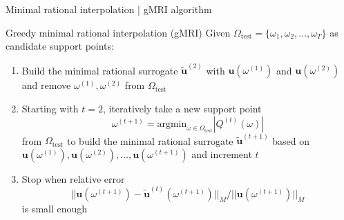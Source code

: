 \documentclass{beamer}
\begin{document}
\begin{frame}{Minimal rational interpolation | gMRI algorithm}
    
    \begin{block}{Greedy minimal rational interpolation (gMRI) \cite{shortMRI}}
        Given $\Omega_{\text{test}} = \{\omega_1, \omega_2, \dots, \omega_T\}$ as candidate support points:
        \begin{enumerate}
            \item<2-> Build the minimal rational surrogate $\mathbf{\tilde{u}}^{(2)}$
                      with $\mathbf{u}(\omega^{(1)})$ and $\mathbf{u}(\omega^{(2)})$
                      and remove $\omega^{(1)}, \omega^{(2)}$ from $\Omega_{\text{test}}$
            \item<3-> Starting with $t=2$, iteratively take a new support point
            \begin{equation*}
                \omega^{(t+1)} = \text{argmin}_{\omega \in \Omega_{\text{test}}} |Q^{(t)}(\omega)|
            \end{equation*}
            from $\Omega_{\text{test}}$ to build the minimal rational surrogate $\mathbf{\tilde{u}}^{(t+1)}$
            based on $\mathbf{u}(\omega^{(1)}), \mathbf{u}(\omega^{(2)}), \dots, \mathbf{u}(\omega^{(t+1)})$
            and increment $t$
            \item<4-> Stop when relative error 
            \begin{equation*}
                ||\mathbf{u}(\omega^{(t+1)}) - \mathbf{\tilde{u}}^{(t)}(\omega^{(t+1)})||_M / ||\mathbf{u}(\omega^{(t+1)})||_M
            \end{equation*}
            is small enough
        \end{enumerate}
    \end{block}

\end{frame}
\end{document}
